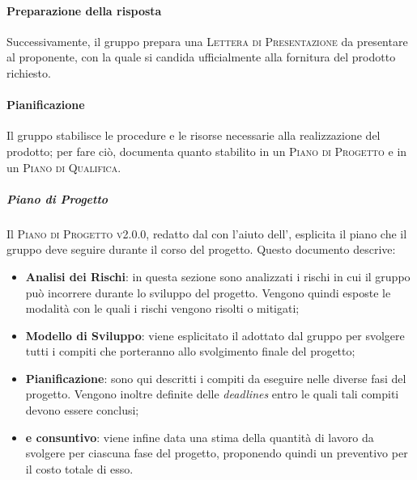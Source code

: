 \documentclass[../norme-di-progetto.tex]{subfiles}
\begin{document}
\paragraph{Preparazione della risposta}
Successivamente, il gruppo prepara una \textsc{Lettera di Presentazione} da presentare al proponente, con la quale si candida ufficialmente alla fornitura del prodotto richiesto.

\paragraph{Pianificazione}
Il gruppo stabilisce le procedure e le risorse necessarie alla realizzazione del prodotto; per fare ciò, documenta quanto stabilito in un \textsc{Piano di Progetto} e in un \textsc{Piano di Qualifica}.

\subparagraph*{Piano di Progetto}
Il \textsc{Piano di Progetto v2.0.0}, redatto dal  con l'aiuto dell', esplicita il piano che il gruppo deve seguire durante il corso del progetto. Questo documento descrive:
\begin{itemize}
  \item \textbf{Analisi dei Rischi}: in questa sezione sono analizzati i rischi in cui il gruppo può incorrere durante lo sviluppo del progetto. Vengono quindi esposte le modalità con le quali i rischi vengono risolti o mitigati;
  \item \textbf{Modello di Sviluppo}: viene esplicitato il  adottato dal gruppo per svolgere tutti i compiti che porteranno allo svolgimento finale del progetto;
  \item \textbf{Pianificazione}: sono qui descritti i compiti da eseguire nelle diverse fasi del progetto. Vengono inoltre definite delle \textit{deadlines} entro le quali tali compiti devono essere conclusi;
  \item \textbf{ e consuntivo}: viene infine data una stima della quantità di lavoro da svolgere per ciascuna fase del progetto, proponendo quindi un preventivo per il costo totale di esso.
\end{itemize}
\end{document}
